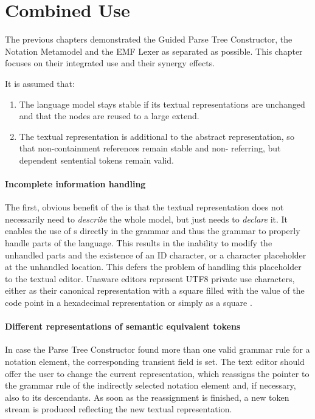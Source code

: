 \section{Combined Use}

The previous chapters demonstrated the Guided Parse Tree Constructor, the Notation Metamodel and the EMF Lexer as separated as possible. This chapter focuses on their integrated use and their synergy effects.

It is assumed that:
\begin{enumerate}
	\item The language model stays stable if its textual representations are unchanged and that the nodes are reused to a large extend.
	\item The textual representation is additional to the abstract representation, so that non-containment references remain stable and non- referring, but  dependent sentential tokens remain valid.
\end{enumerate}


\paragraph{Incomplete information handling}
The first, obvious benefit of the  is that the textual representation does not necessarily need to \emph{describe} the whole model, but just needs to \emph{declare} it. It enables the use of s directly in the grammar and thus the grammar to properly handle parts of the language. This results in the inability to modify the unhandled parts and the existence of an ID character, or a character placeholder at the unhandled location. This defers the problem of handling this placeholder to the textual editor. Unaware editors represent UTF8 private use characters, either as their canonical representation with a square filled with the value of the code point in a hexadecimal representation or simply as a square \code{$\square$}.

\paragraph{Different representations of semantic equivalent tokens}
In case the Parse Tree Constructor found more than one valid grammar rule for a notation element, the corresponding transient field is set. The text editor should offer the user to change the current representation, which reassigns the pointer to the grammar rule of the indirectly selected notation element and, if necessary, also to its descendants. As soon as the reassignment is finished, a new token stream is produced reflecting the new textual representation.

